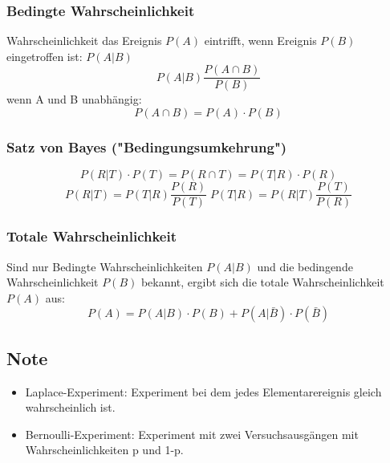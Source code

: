 \documentclass[margin=normal]{tex/hsrzf}
\begin{document}
\begin{multicols}{2}

    \subsubsection{Bedingte Wahrscheinlichkeit}
    Wahrscheinlichkeit das Ereignis $P(A)$ eintrifft,
    wenn Ereignis $P(B)$ eingetroffen ist: $P(A|B)$
    $$P(A|B)\frac{P(A\cap B)}{P(B)}$$
    wenn A und B unabhängig:
    $$P(A \cap B) = P(A) \cdot P(B)$$
    \subsubsection*{Satz von Bayes ("Bedingungsumkehrung")}
    $$P(R|T) \cdot P(T) = P(R \cap T) = P(T|R) \cdot P(R)$$
    $$P(R|T) = P(T|R) \frac{P(R)}{P(T)}\;
        P(T|R) = P(R|T) \frac{P(T)}{P(R)}$$
    \subsubsection{Totale Wahrscheinlichkeit}
    Sind nur Bedingte Wahrscheinlichkeiten $P(A|B)$ und die bedingende Wahrscheinlichkeit
    $P(B)$ bekannt, ergibt sich die totale Wahrscheinlichkeit $P(A)$ aus:
    $$P(A) = P(A|B) \cdot P(B) + P(A|\bar{B})\cdot P(\bar{B})$$
    \subsection*{Note}
    \begin{itemize}
        \item Laplace-Experiment: Experiment bei dem jedes Elementarereignis gleich wahrscheinlich ist.
        \item Bernoulli-Experiment: Experiment mit zwei Versuchsausgängen mit Wahrscheinlichkeiten p und 1-p.
    \end{itemize}
\end{multicols}
\end{document}
